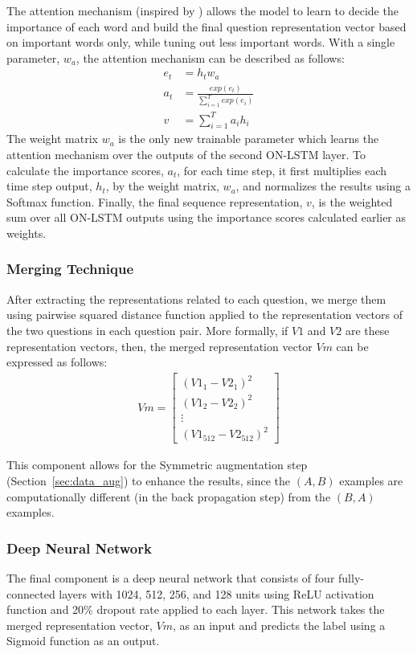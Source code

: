 \documentclass[11pt,a4paper]{article}
\begin{document}
The attention mechanism (inspired by \cite{bahdanau2014neural,yang2016hierarchical}) allows the model to learn to decide the importance of each word and build the final question representation vector based on important words only, while tuning out less important words. With a single parameter, $w_a$, the attention mechanism can be described as follows:
\begin{align}
e_t &= h_t w_a\\
a_t &= \frac{exp(e_t)}{\sum_{i=1}^{T} exp(e_i)}\\
v &= \sum_{i=1}^{T} a_i h_i
\end{align}
The weight matrix $w_a$ is the only new trainable parameter which learns the attention mechanism over the outputs of the second ON-LSTM layer. To calculate the importance scores, $a_t$, for each time step, it first multiplies each time step output, $h_t$, by the weight matrix, $w_a$, and normalizes the results using a Softmax function. Finally, the final sequence representation, $v$, is the weighted sum over all ON-LSTM outputs using the importance scores calculated earlier as weights.

\subsubsection{Merging Technique}

After extracting the representations related to each question, we merge them using pairwise squared distance function applied to the representation vectors of the two questions in each question pair. More formally, if $V1$ and $V2$ are these representation vectors, then, the merged representation vector $Vm$ can be expressed as follows:
\begin{align}
Vm = 
\begin{bmatrix}
(V1_{1} - V2_{1})^2 \\ (V1_{2} - V2_{2})^2 \\ \vdots \\ (V1_{512} - V2_{512})^2
\end{bmatrix}
\end{align}

This component allows for the Symmetric augmentation step (Section~\ref{sec:data_aug}) to enhance the results, since the $(A, B)$ examples are computationally different (in the back propagation step) from the $(B, A)$ examples.

\subsubsection{Deep Neural Network}
The final component is a deep neural network that consists of four fully-connected layers with 1024, 512, 256, and 128 units using ReLU activation function and 20\% dropout rate applied to each layer. This network takes the merged representation vector, $Vm$, as an input and predicts the label using a Sigmoid function as an output.
\end{document}
